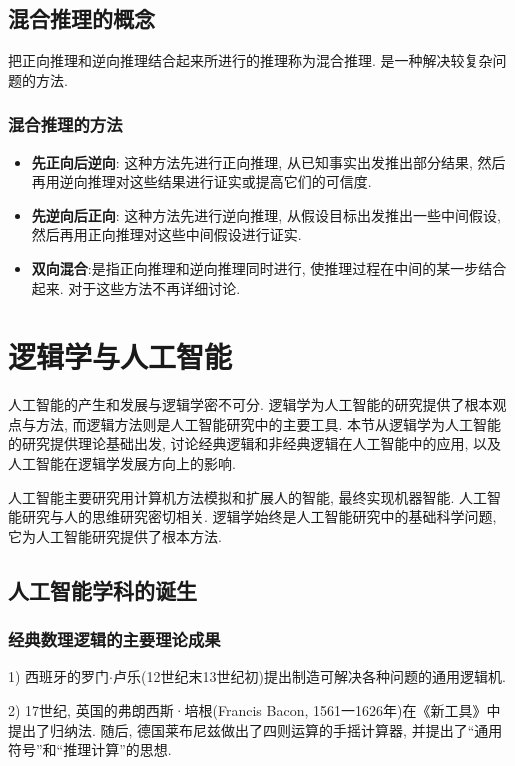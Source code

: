 \subsection{混合推理的概念}
把正向推理和逆向推理结合起来所进行的推理称为混合推理. 是一种解决较复杂问题的方法.
\subsubsection{混合推理的方法}
\begin{itemize}
\item \textbf{先正向后逆向}: 这种方法先进行正向推理, 从已知事实出发推出部分结果, 然后再用逆向推理对这些结果进行证实或提高它们的可信度.
\item \textbf{先逆向后正向}: 这种方法先进行逆向推理, 从假设目标出发推出一些中间假设, 然后再用正向推理对这些中间假设进行证实.
\item \textbf{双向混合}:是指正向推理和逆向推理同时进行, 使推理过程在中间的某一步结合起来. 对于这些方法不再详细讨论.
\end{itemize}
\section{逻辑学与人工智能}

人工智能的产生和发展与逻辑学密不可分. 逻辑学为人工智能的研究提供了根本观点与方法, 而逻辑方法则是人工智能研究中的主要工具. 本节从逻辑学为人工智能的研究提供理论基础出发, 讨论经典逻辑和非经典逻辑在人工智能中的应用, 以及人工智能在逻辑学发展方向上的影响.

人工智能主要研究用计算机方法模拟和扩展人的智能, 最终实现机器智能. 人工智能研究与人的思维研究密切相关. 逻辑学始终是人工智能研究中的基础科学问题, 它为人工智能研究提供了根本方法.

\subsection{人工智能学科的诞生}
\subsubsection{经典数理逻辑的主要理论成果}
1) 西班牙的罗门$\cdot$卢乐(12世纪末13世纪初)提出制造可解决各种问题的通用逻辑机.

2) 17世纪, 英国的弗朗西斯·培根(Francis Bacon, 1561一1626年)在《新工具》中提出了归纳法. 随后, 德国莱布尼兹做出了四则运算的手摇计算器, 并提出了“通用符号”和“推理计算”的思想.

